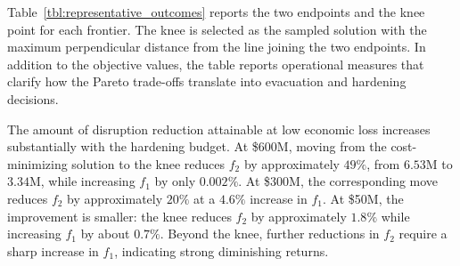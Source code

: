 \documentclass[preprint,11pt,authoryear]{elsarticle}
\begin{document}
Table~\ref{tbl:representative_outcomes} reports the two endpoints and the knee
point for each frontier. The knee is selected as the sampled solution with the
maximum perpendicular distance from the line joining the two endpoints. In
addition to the objective values, the table reports operational measures that
clarify how the Pareto trade-offs translate into evacuation and hardening
decisions.

\begin{table}[!t]
\centering
\small
\setlength{\tabcolsep}{3.5pt}
\renewcommand{\arraystretch}{1.05}
\caption{Objective and operational outcomes for representative Pareto policies. Objective values are reported in millions. Hardening coverage
is the percentage of exposed facilities receiving positive protection, and
average depth is the mean protection level as a percentage of the maximum
required level.}
\label{tbl:representative_outcomes}
\end{table}

The amount of disruption reduction attainable at low economic loss increases
substantially with the hardening budget. At \$600M, moving from the
cost-minimizing solution to the knee reduces $f_2$ by approximately $49\%$,
from $6.53$M to $3.34$M, while increasing $f_1$ by only $0.002\%$.
At \$300M, the corresponding move reduces $f_2$ by approximately $20\%$ at
a $4.6\%$ increase in $f_1$. At \$50M, the improvement is smaller: the knee
reduces $f_2$ by approximately $1.8\%$ while increasing $f_1$ by about
$0.7\%$. Beyond the knee, further reductions in $f_2$ require a sharp increase in $f_1$, indicating strong diminishing returns.
\end{document}
